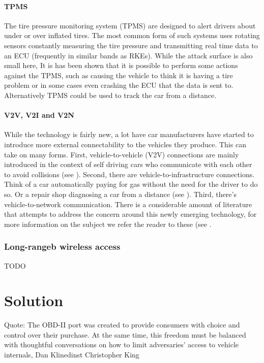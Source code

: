 \documentclass[11pt]{article}
\begin{document}
\paragraph{TPMS} The tire pressure monitoring system (TPMS) are designed to alert drivers about under or over inflated tires. The most common form of such systems uses rotating sensors constantly measuring the tire pressure and transmitting real time data to an ECU (frequently in similar bands as RKEs)\cite{Kosher}. While the attack surface is also small here, It is has been shown that it is possible to perform some actions against the TPMS, such as causing the vehicle to think it is having a tire problem\cite{TPMS} or in some cases even crashing the ECU that the data is sent to\cite{MillerA}. Alternatively TPMS could be used to track the car from a distance\cite{TPMS}.

\paragraph{V2V, V2I and V2N} While the technology is fairly new, a lot have car manufacturers have started to introduce more external connectability to the vehicles they produce. This can take on many forms\cite{Ahmed}. First, vehicle-to-vehicle (V2V) connections are mainly introduced in the context of self driving cars who communicate with each other to avoid collisions (see \cite{Enisa}). Second, there are vehicle-to-infrastructure connections. Think of a car automatically paying for gas without the need for the driver to do so. Or a repair shop diagnosing a car from a distance (see \cite{Kleberger}). Third, there's vehicle-to-network communication. There is a considerable amount of literature that attempts to address the concern around this newly emerging technology, for more information on the subject we refer the reader to these (see \cite{Kleberger15}\cite{Russel17}\cite{Maxim}\cite{Crispo}.

\subsubsection{Long-rangeb wireless access} TODO

\section{Solution}
Quote: The OBD-II port was created to provide consumers with choice and control over their purchase. At the same time, this freedom must be balanced with thoughtful conversations on how to limit adversaries’ access to vehicle internals, Dan Klinedinst Christopher King
\end{document}

